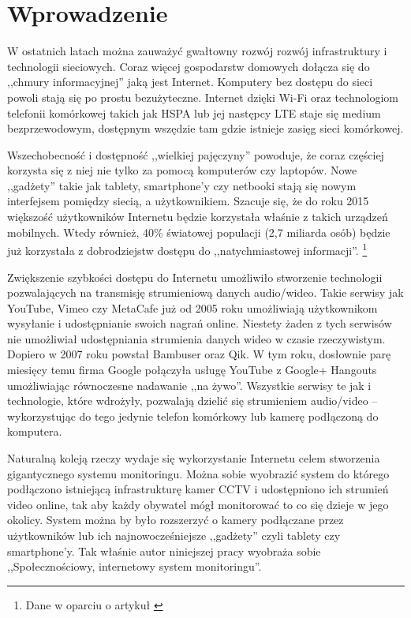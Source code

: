 \chapter{Wprowadzenie}
\label{cha:wprowadzenie}

W ostatnich latach można zauważyć gwałtowny rozwój rozwój infrastruktury i technologii sieciowych. Coraz więcej gospodarstw domowych dołącza się do ,,chmury informacyjnej'' jaką jest Internet. Komputery bez dostępu do sieci powoli stają się po prostu bezużyteczne. Internet dzięki Wi-Fi oraz technologiom telefonii komórkowej takich jak HSPA lub jej następcy LTE staje się medium bezprzewodowym, dostępnym wszędzie tam gdzie istnieje zasięg sieci komórkowej.

Wszechobecność i dostępność ,,wielkiej pajęczyny'' powoduje, że coraz częściej korzysta się z niej nie tylko za pomocą komputerów czy laptopów. Nowe ,,gadżety'' takie jak tablety, smartphone'y czy netbooki stają się nowym interfejsem pomiędzy siecią, a użytkownikiem. Szacuje się, że do roku 2015 większość użytkowników Internetu będzie korzystała właśnie z takich urządzeń mobilnych. Wtedy również, 40\% światowej populacji (2,7 miliarda osób) będzie już korzystała z dobrodziejstw dostępu do ,,natychmiastowej informacji''. \footnote{Dane w oparciu o  artykuł \cite{Kim11}}

Zwiększenie szybkości dostępu do Internetu umożliwiło stworzenie technologii pozwalających na transmisję strumieniową danych audio/wideo. Takie serwisy jak YouTube, Vimeo czy MetaCafe już od 2005 roku umożliwiają użytkownikom wysyłanie i udostępnianie swoich nagrań online. Niestety żaden z tych serwisów nie umożliwiał udostępniania strumienia danych wideo w czasie rzeczywistym. Dopiero w 2007 roku powstał Bambuser oraz Qik. W tym roku, dosłownie parę miesięcy temu firma Google połączyła usługę YouTube z Google+ Hangouts umożliwiając równoczesne nadawanie ,,na żywo''. Wszystkie serwisy te jak i technologie, które wdrożyły, pozwalają dzielić się strumieniem audio/video -- wykorzystując do tego jedynie telefon komórkowy lub kamerę podłączoną do komputera.

Naturalną koleją rzeczy wydaje się wykorzystanie Internetu celem stworzenia gigantycznego systemu monitoringu. Można sobie wyobrazić system do którego podłączono istniejącą infrastrukturę kamer CCTV i udostępniono ich strumień video online, tak aby każdy obywatel mógł monitorować to co się dzieje w jego okolicy. System można by było rozszerzyć o kamery podłączane przez użytkowników lub ich najnowocześniejsze ,,gadżety'' czyli tablety czy smartphone'y. Tak właśnie autor niniejszej pracy wyobraża sobie ,,Społecznościowy, internetowy system monitoringu''.

